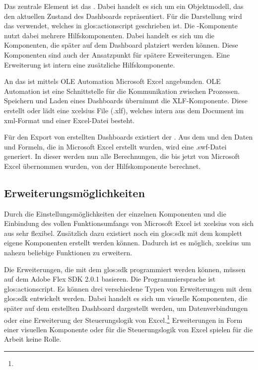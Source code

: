 \begin{onehalfspacing}
Das zentrale Element ist das . Dabei handelt es sich um ein Objektmodell, das den aktuellen Zustand des Dashboards repräsentiert. Für die Darstellung wird das  verwendet, welches in \gls{glos:actionscript} geschrieben ist. Die -Komponente nutzt dabei mehrere Hilfskomponenten. Dabei handelt es sich um die Komponenten, die später auf dem Dashboard platziert werden können. Diese Komponenten sind auch der Ansatzpunkt für spätere Erweiterungen. Eine Erweiterung ist intern eine zusätzliche Hilfskomponente.

An das  ist mittels OLE Automation Microsoft Excel angebunden. OLE Automation ist eine Schnittstelle für die Kommunikation zwischen Prozessen. Speichern und Laden eines Dashboards übernimmt die XLF-Komponente. Diese erstellt oder lädt eine \gls{xcelsius} File (.xlf), welches intern aus dem Document im \gls{xml}-Format und einer Excel-Datei besteht.

Für den Export von erstellten Dashboards existiert der . Aus dem  und den Daten und Formeln, die in Microsoft Excel erstellt wurden, wird eine .swf-Datei generiert. In dieser werden nun alle Berechnungen, die bis jetzt von Microsoft Excel übernommen wurden, von der Hilfskomponente  berechnet.

\subsection{Erweiterungsmöglichkeiten}

Durch die Einstellungsmöglichkeiten der einzelnen Komponenten und die Einbindung des vollen Funktionsumfangs von Microsoft Excel ist \gls{xcelsius} von sich aus sehr flexibel. Zusätzlich dazu existiert noch ein \gls{glos:sdk} mit dem komplett eigene Komponenten erstellt werden können. Dadurch ist es möglich, \gls{xcelsius} um nahezu beliebige Funktionen zu erweitern.

Die Erweiterungen, die mit dem \gls{glos:sdk} programmiert werden können, müssen auf dem Adobe Flex SDK 2.0.1 basieren. Die Programmiersprache ist \gls{glos:actionscript}. Es können drei verschiedene Typen von Erweiterungen mit dem \gls{glos:sdk} entwickelt werden. Dabei handelt es sich um visuelle Komponenten, die später auf dem erstellten Dashboard dargestellt werden, um Datenverbindungen oder eine Erweiterung der Steuerungslogik von Excel.\footnote{ } Erweiterungen in Form einer visuellen Komponente oder für die Steuerungslogik von Excel spielen für die Arbeit keine Rolle.


\end{onehalfspacing}
